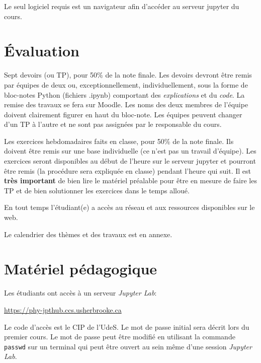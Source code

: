 \documentclass[10pt,usletter]{article}
\begin{document}
Le seul logiciel requis est un navigateur afin d'accéder au serveur jupyter du cours.

\section{Évaluation}

\begin{compactenum}[1.~]
\item Sept devoirs (ou TP), pour 50\% de la note finale. Les devoirs devront être remis par équipes de deux ou, exceptionnellement, individuellement, sous la forme de bloc-notes Python (fichiers .ipynb) comportant des \textit{explications} et du \textit{code}. La remise des travaux se fera sur Moodle. Les noms des deux membres de l'équipe doivent clairement figurer en haut du bloc-note. Les équipes peuvent changer d'un TP à l'autre et ne sont pas assignées par le responsable du cours.
\item Les exercices hebdomadaires faits en classe, pour 50\% de la note finale. Ils doivent être remis sur une base individuelle (ce n'est pas un travail d'équipe). Les exercices seront disponibles au début de l'heure sur le serveur jupyter et pourront être remis (la procédure sera expliquée en classe) pendant l'heure qui suit. Il est \textbf{très important} de bien lire le matériel préalable pour être en mesure de faire les TP et de bien solutionner les exercices dans le temps alloué.
\item En tout temps l'étudiant(e) a accès au réseau et aux ressources disponibles sur le web.
\end{compactenum}
Le calendrier des thèmes et des travaux est en annexe.

\section{Matériel pédagogique}

Les étudiants ont accès à un serveur {\it Jupyter Lab}:

\href{https://phy-jpthub.ccs.usherbrooke.ca}{https://phy-jpthub.ccs.usherbrooke.ca}

Le code d'accès est le CIP de l'UdeS. Le mot de passe initial sera décrit lors du premier cours.
Le mot de passe peut être modifié en utilisant la commande \texttt{passwd} sur un terminal qui peut être ouvert au sein même d'une session {\it Jupyter Lab}.
\end{document}
